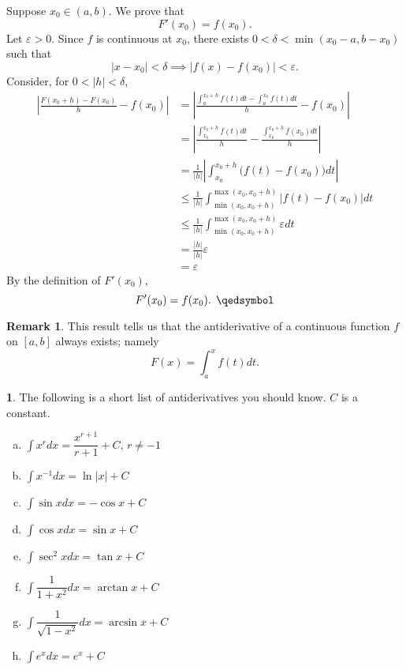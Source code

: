 \documentclass[11pt]{article}
\theoremstyle{definition}
\newtheorem{remark}[thm]{Remark}
\newtheorem{none}[thm]{}
\begin{document}
Suppose $x_0 \in (a, b)$. We prove that 
$$F'(x_0) = f(x_0) \text{.}$$
Let $\varepsilon > 0$. Since $f$ is continuous at $x_0$, there exists $0 < \delta < \min(x_0 - a, b - x_0)$ such that
$$|x - x_0| < \delta \implies |f(x) - f(x_0)| < \varepsilon \text{.}$$
Consider, for $0 < |h| < \delta$,
\begin{align*}
\left|\frac{F(x_0 + h) - F(x_0)}h - f(x_0)\right| & = \left|\frac{\int_a^{x_0+h} f(t)dt - \int_a^{x_0} f(t)dt}h - f(x_0)\right| \\
& = \left|\frac{\int_{x_0}^{x_0 + h} f(t)dt}h - \frac{\int_{x_0}^{x_0+h} f(x_0)dt}h\right| \\
& = \frac{1}{|h|} \left| \int_{x_0}^{x_0 + h} \Big(f(t) - f(x_0)\Big)dt\right| \\
& \leq \frac{1}{|h|} \int_{\min(x_0, x_0 + h)}^{\max(x_0, x_0+h)} |f(t) - f(x_0)|dt \\
& \leq \frac{1}{|h|} \int_{\min(x_0, x_0 +h)}^{\max(x_0, x_0+h)} \varepsilon dt \\
& = \frac{|h|}{|h|} \varepsilon \\
& = \varepsilon
\end{align*}
By the definition of $F'(x_0)$,
$$F'(x_0) = f(x_0) \text{. } \qedsymbol$$

\begin{remark}
This result tells us that the antiderivative of a continuous function $f$ on $[a, b]$ always exists; namely
$$F(x) = \int_a^x f(t)dt \text{.}$$
\end{remark}

\begin{none}
The following is a short list of antiderivatives you should know. $C$ is a constant.
\begin{enumerate}[(a)] \vspace{-0.2cm}
\item $\displaystyle\int x^rdx = \dfrac{x^{r+1}}{r+1} + C$, $r \ne -1$ 
\item $\displaystyle\int x^{-1}dx = \ln|x| + C$
\item $\displaystyle\int \sin xdx = -\cos x + C$
\item $\displaystyle\int \cos xdx = \sin x + C$
\item $\displaystyle\int \sec^2xdx = \tan x + C$
\item $\displaystyle\int \dfrac{1}{1+x^2}dx = \arctan x + C$
\item $\displaystyle\int \dfrac{1}{\sqrt{1-x^2}}dx = \arcsin x + C$
\item $\displaystyle\int e^xdx = e^x + C$
\end{enumerate}
\end{none}
\end{document}
